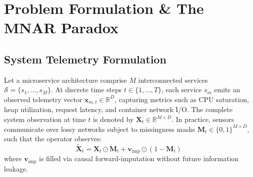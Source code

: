 \documentclass[conference]{IEEEtran}
\begin{document}
\begin{table}[h]
\centering
\caption{Competitive Delta: Constrained-xAIOps vs. Leading Baselines}
\label{tab:competitive_delta}
\end{table}

\section{Problem Formulation \& The MNAR Paradox}

\subsection{System Telemetry Formulation}
Let a microservice architecture comprise $M$ interconnected services $\mathcal{S} = \{s_1, \dots, s_M\}$. At discrete time steps $t \in \{1, \dots, T\}$, each service $s_m$ emits an observed telemetry vector $\mathbf{x}_{m,t} \in \mathbb{R}^{D}$, capturing metrics such as CPU saturation, heap utilization, request latency, and container network I/O.
The complete system observation at time $t$ is denoted by $\mathbf{X}_t \in \mathbb{R}^{M \times D}$. In practice, sensors communicate over lossy networks subject to missingness masks $\mathbf{M}_t \in \{0, 1\}^{M \times D}$, such that the operator observes:
\begin{equation}
\tilde{\mathbf{X}}_t = \mathbf{X}_t \odot \mathbf{M}_t + \mathbf{v}_{\text{imp}} \odot (1 - \mathbf{M}_t)
\end{equation}
where $\mathbf{v}_{\text{imp}}$ is filled via causal forward-imputation without future information leakage.
\end{document}
